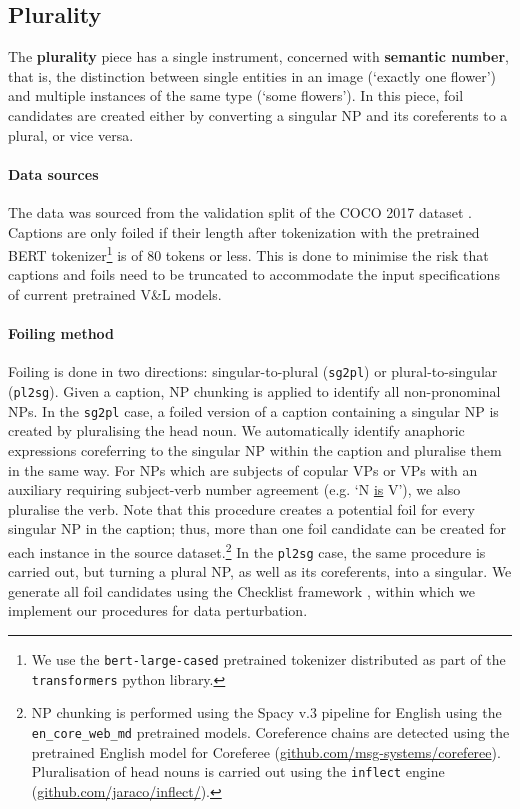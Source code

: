 \documentclass[11pt]{article}
\begin{document}
\subsection{Plurality}\label{app:plurality}
The \textbf{plurality} piece has a single instrument, concerned with {\bf semantic number}, that is, the distinction between single entities in an image (`exactly one flower') and multiple instances of the same type (`some flowers'). In this piece, foil candidates are created either by converting a singular NP and its coreferents to a plural, or vice versa. 

\paragraph{Data sources} The data was sourced from the validation split of the COCO 2017 dataset \cite{Chen2015}. Captions are only foiled if their length after tokenization with the pretrained BERT tokenizer\footnote{We use the {\tt bert-large-cased} pretrained tokenizer distributed as part of the {\tt transformers} python library.} is of 80 tokens or less. This is done to minimise the risk that captions and foils need to be truncated to accommodate the input specifications of current pretrained V\&L models.

\paragraph{Foiling method} Foiling is done in two directions: singular-to-plural ({\tt sg2pl}) or plural-to-singular ({\tt pl2sg}). Given a caption, NP chunking is applied to identify all non-pronominal NPs. In the {\tt sg2pl} case, a foiled version of a caption containing a singular NP is created by pluralising the head noun.
We automatically identify anaphoric expressions coreferring to the singular NP within the caption and pluralise them in the same way.
For NPs which are subjects of copular VPs or VPs with an auxiliary requiring subject-verb number agreement (e.g. `N \underline{is} V'), we also pluralise the verb.
Note that this procedure creates a potential foil for every singular NP in the caption; thus, more than one foil candidate can be created for each instance in the source dataset.\footnote{NP chunking is performed using the Spacy v.3 pipeline for English using the {\tt en\_core\_web\_md} pretrained models. Coreference chains are detected using the pretrained English model for Coreferee (\url{github.com/msg-systems/coreferee}). Pluralisation of head nouns is carried out using the {\tt inflect} engine (\url{github.com/jaraco/inflect/}).}
In the {\tt pl2sg} case, the same procedure is carried out, but turning a plural NP, as well as its coreferents, into a singular. We generate all foil candidates using the Checklist framework \cite{ribeiro-etal-2020-beyond}, within which we implement our procedures for data perturbation.
\end{document}
